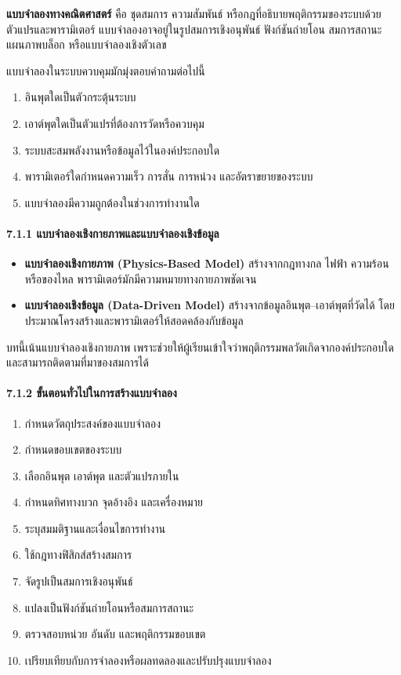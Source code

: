 \textbf{แบบจำลองทางคณิตศาสตร์} คือ ชุดสมการ ความสัมพันธ์ หรือกฎที่อธิบายพฤติกรรมของระบบด้วยตัวแปรและพารามิเตอร์ แบบจำลองอาจอยู่ในรูปสมการเชิงอนุพันธ์ ฟังก์ชันถ่ายโอน สมการสถานะ แผนภาพบล็อก หรือแบบจำลองเชิงตัวเลข

แบบจำลองในระบบควบคุมมักมุ่งตอบคำถามต่อไปนี้

\begin{enumerate}
    \item อินพุตใดเป็นตัวกระตุ้นระบบ
    \item เอาต์พุตใดเป็นตัวแปรที่ต้องการวัดหรือควบคุม
    \item ระบบสะสมพลังงานหรือข้อมูลไว้ในองค์ประกอบใด
    \item พารามิเตอร์ใดกำหนดความเร็ว การสั่น การหน่วง และอัตราขยายของระบบ
    \item แบบจำลองมีความถูกต้องในช่วงการทำงานใด
\end{enumerate}

\paragraph{7.1.1 แบบจำลองเชิงกายภาพและแบบจำลองเชิงข้อมูล}

\begin{itemize}
    \item \textbf{แบบจำลองเชิงกายภาพ (Physics-Based Model)} สร้างจากกฎทางกล ไฟฟ้า ความร้อน หรือของไหล พารามิเตอร์มักมีความหมายทางกายภาพชัดเจน
    \item \textbf{แบบจำลองเชิงข้อมูล (Data-Driven Model)} สร้างจากข้อมูลอินพุต–เอาต์พุตที่วัดได้ โดยประมาณโครงสร้างและพารามิเตอร์ให้สอดคล้องกับข้อมูล
\end{itemize}

บทนี้เน้นแบบจำลองเชิงกายภาพ เพราะช่วยให้ผู้เรียนเข้าใจว่าพฤติกรรมพลวัตเกิดจากองค์ประกอบใด และสามารถติดตามที่มาของสมการได้

\paragraph{7.1.2 ขั้นตอนทั่วไปในการสร้างแบบจำลอง}

\begin{enumerate}
    \item กำหนดวัตถุประสงค์ของแบบจำลอง
    \item กำหนดขอบเขตของระบบ
    \item เลือกอินพุต เอาต์พุต และตัวแปรภายใน
    \item กำหนดทิศทางบวก จุดอ้างอิง และเครื่องหมาย
    \item ระบุสมมติฐานและเงื่อนไขการทำงาน
    \item ใช้กฎทางฟิสิกส์สร้างสมการ
    \item จัดรูปเป็นสมการเชิงอนุพันธ์
    \item แปลงเป็นฟังก์ชันถ่ายโอนหรือสมการสถานะ
    \item ตรวจสอบหน่วย อันดับ และพฤติกรรมขอบเขต
    \item เปรียบเทียบกับการจำลองหรือผลทดลองและปรับปรุงแบบจำลอง
\end{enumerate}

